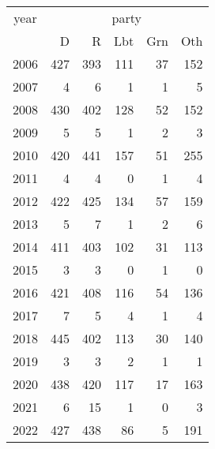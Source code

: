 \footnotesize\begin{tabular}[t]{lrrrrr}
\toprule
\multicolumn{1}{c}{year} & \multicolumn{5}{c}{party} \\
\cmidrule(l{3pt}r{3pt}){1-1} \cmidrule(l{3pt}r{3pt}){2-6}
  & D & R & Lbt & Grn & Oth\\
\midrule
2006 & 427 & 393 & 111 & 37 & 152\\
2007 & 4 & 6 & 1 & 1 & 5\\
2008 & 430 & 402 & 128 & 52 & 152\\
2009 & 5 & 5 & 1 & 2 & 3\\
2010 & 420 & 441 & 157 & 51 & 255\\
2011 & 4 & 4 & 0 & 1 & 4\\
2012 & 422 & 425 & 134 & 57 & 159\\
2013 & 5 & 7 & 1 & 2 & 6\\
2014 & 411 & 403 & 102 & 31 & 113\\
2015 & 3 & 3 & 0 & 1 & 0\\
2016 & 421 & 408 & 116 & 54 & 136\\
2017 & 7 & 5 & 4 & 1 & 4\\
2018 & 445 & 402 & 113 & 30 & 140\\
2019 & 3 & 3 & 2 & 1 & 1\\
2020 & 438 & 420 & 117 & 17 & 163\\
2021 & 6 & 15 & 1 & 0 & 3\\
2022 & 427 & 438 & 86 & 5 & 191\\
\bottomrule
\end{tabular}
